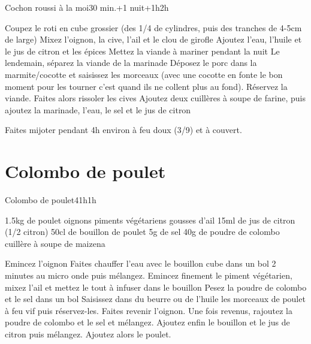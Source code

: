 {\begin{recette}{Cochon roussi à la moi}{}{30 min.+1 nuit+1h}{2h}
\begin{preparation}
\etape Coupez le roti en cube grossier (des 1/4 de cylindres, puis des tranches de 4-5cm de large)
\etape Mixez l'oignon, la cive, l'ail et le clou de girofle
\etape Ajoutez l'eau, l'huile et le jus de citron et les épices
\etape Mettez la viande à mariner pendant la nuit
\etape Le lendemain, séparez la viande de la marinade
\etape Déposez le porc dans la marmite/cocotte et saisissez les morceaux (avec une cocotte en fonte le bon moment pour les tourner c'est quand ils ne collent plus au fond).
\etape Réservez la viande. Faites alors rissoler les cives
\etape Ajoutez deux cuillères à soupe de farine, puis ajoutez la marinade, l'eau, le sel et le jus de citron
\end{preparation}

\begin{cuisson}
Faites mijoter pendant 4h environ à feu doux (3/9) et à couvert.
\end{cuisson}
\end{recette}

\section{Colombo de poulet}
\begin{recette}{Colombo de poulet}{4}{1h}{1h}
\begin{ingredients}
\ingredient 1.5kg de poulet
 oignons
 piments végétariens
 gousses d'ail
\ingredient 15ml de jus de citron (1/2 citron)
\ingredient 50cl de bouillon de poulet
\ingredient 5g de sel
\ingredient 40g de poudre de colombo
 cuillère à soupe de maizena
\end{ingredients}


\begin{preparation}
\etape Emincez l'oignon
\etape Faites chauffer l'eau avec le bouillon cube dans un bol 2 minutes au micro onde puis mélangez. 
\etape Emincez finement le piment végétarien, mixez l'ail et mettez le tout à infuser dans le bouillon
\etape Pesez la poudre de colombo et le sel dans un bol
\etape Saisissez dans du beurre ou de l'huile les morceaux de poulet à feu vif puis réservez-les.
\etape Faites revenir l'oignon.
\etape Une fois revenus, rajoutez la poudre de colombo et le sel et mélangez. 
\etape Ajoutez enfin le bouillon et le jus de citron puis mélangez. Ajoutez alors le poulet.
\end{preparation}


\end{recette}}
